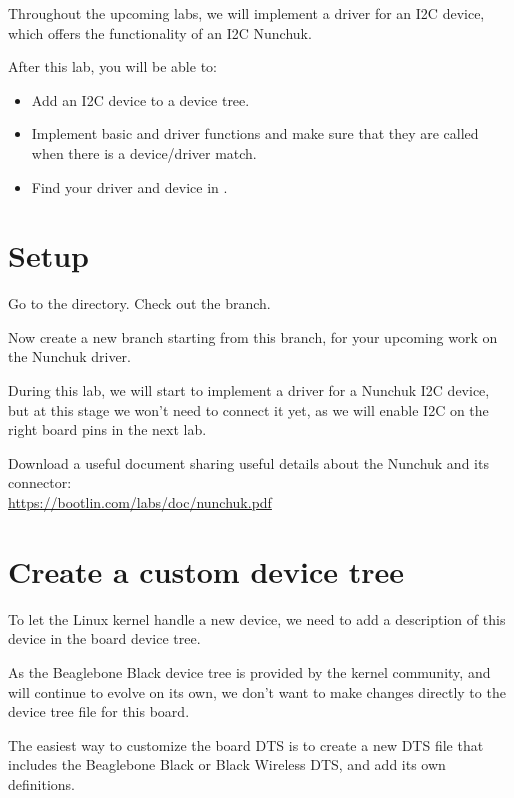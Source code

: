 
Throughout the upcoming labs, we will implement a driver for an I2C
device, which offers the functionality of an I2C Nunchuk.

After this lab, you will be able to:

\begin{itemize}
\item Add an I2C device to a device tree.
\item Implement basic  and  driver
functions and make sure that they are called when there is a
device/driver match.
\item Find your driver and device in .
\end{itemize}

\section{Setup}

Go to the  directory. Check out the
 branch.

Now create a new  branch starting from this branch,
for your upcoming work on the Nunchuk driver.

During this lab, we will start to implement a driver for a
Nunchuk I2C device, but at this stage we won't need to connect
it yet, as we will enable I2C on the right board pins in the
next lab.

Download a useful document sharing useful details about the Nunchuk
and its connector:\\
\url{https://bootlin.com/labs/doc/nunchuk.pdf}

\section{Create a custom device tree}

To let the Linux kernel handle a new device, we need to add a
description of this device in the board device tree.

As the Beaglebone Black device tree is provided by the kernel community,
and will continue to evolve on its own, we don't want to make changes
directly to the device tree file for this board.

The easiest way to customize the board DTS is to create a new DTS file
that includes the Beaglebone Black or Black Wireless DTS, and add
its own definitions.

